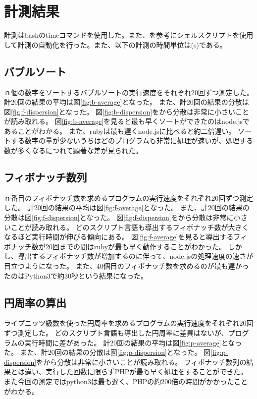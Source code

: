 \chapter{計測結果}
\label{cha:result}
計測はbashのtimeコマンドを使用した。また、\cite{bash}を参考にシェルスクリプトを使用して計測の自動化を行った。また、以下の計測の時間単位は(s)である。
\section{バブルソート}
ｎ個の数字をソートするバブルソートの実行速度をそれぞれ20回ずつ測定した。
計20回の結果の平均は図\ref{fig:b-average}となった。
また、計20回の結果の分散は図\ref{fig:f-dispersion}となった。
図\ref{fig:b-dispersion}をから分散は非常に小さいことが読み取れる。
図\ref{fig:b-average}を見ると最も早くソートができたのはnode.jsであることがわかる。
また、rubyは最も遅くnode.jsに比べると約二倍遅い。
ソートする数字の量が少ないうちはどのプログラムも非常に処理が速いが、処理する数が多くなるにつれて顕著な差が見られた。


\section{フィボナッチ数列}
ｎ番目のフィボナッチ数を求めるプログラムの実行速度をそれぞれ20回ずつ測定した。
計20回の結果の平均は図\ref{fig:f-average}となった。
また、計20回の結果の分散は図\ref{fig:f-dispersion}となった。
図\ref{fig:f-dispersion}をから分散は非常に小さいことが読み取れる。
どのスクリプト言語も導出するフィボナッチ数が大きくなるほど実行時間が伸びる傾向にある。
図\ref{fig:f-average}を見ると導出するフィボナッチ数が20回までの間はrubyが最も早く動作することがわかった。
しかし、導出するフィボナッチ数が増加するのに伴って、node.jsの処理速度の速さが目立つようになった。
また、40個目のフィボナッチ数を求めるのが最も遅かったのはPython3で約30秒という結果になった。

\section{円周率の算出}
ライプニッツ級数を使った円周率を求めるプログラムの実行速度をそれぞれ20回ずつ測定した。
どのスクリプト言語も導出した円周率に差異はないが、プログラムの実行時間に差があった。
計20回の結果の平均は図\ref{fig:p-average}となった。
また、計20回の結果の分散は図\ref{fig:p-dispersion}となった。
図\ref{fig:p-dispersion}をから分散は非常に小さいことが読み取れる。
フィボナッチ数列の結果とは違い、実行した回数に限らずPHPが最も早く処理をすることができた。
また今回の測定ではpython3は最も遅く、PHPの約200倍の時間がかかったことがわかる。

